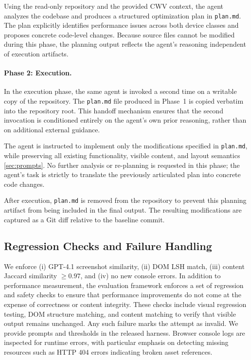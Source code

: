 Using the read-only repository and the provided CWV context, the agent analyzes the codebase and produces a structured optimization plan in \texttt{plan.md}. The plan explicitly identifies performance issues across both device classes and proposes concrete code-level changes. Because source files cannot be modified during this phase, the planning output reflects the agent’s reasoning independent of execution artifacts.

\paragraph{Phase 2: Execution.}
In the execution phase, the same agent is invoked a second time on a writable copy of the repository. The \texttt{plan.md} file produced in Phase~1 is copied verbatim into the repository root. This handoff mechanism ensures that the second invocation is conditioned entirely on the agent’s own prior reasoning, rather than on additional external guidance.

The agent is instructed to implement only the modifications specified in \texttt{plan.md}, while preserving all existing functionality, visible content, and layout semantics \ref{sec:prompts}. No further analysis or re-planning is requested in this phase; the agent’s task is strictly to translate the previously articulated plan into concrete code changes.

After execution, \texttt{plan.md} is removed from the repository to prevent this planning artifact from being included in the final output. The resulting modifications are captured as a Git diff relative to the baseline commit.

\subsection{Regression Checks and Failure Handling}
\label{app:validation}
\label{app:regression}
We enforce (i) GPT-4.1 screenshot similarity, (ii) DOM LSH match, (iii) content Jaccard similarity $\geq 0.97$, and (iv) no new console errors. In addition to performance measurement, the evaluation framework enforces a set of regression and safety checks to ensure that performance improvements do not come at the expense of correctness or content integrity. These checks include visual regression testing, DOM structure matching, and content matching to verify that visible output remains unchanged. Any such failure marks the attempt as invalid. We provide prompts and thresholds in the released harness. Browser console logs are inspected for runtime errors, with particular emphasis on detecting missing resources such as HTTP 404 errors indicating broken asset references.

